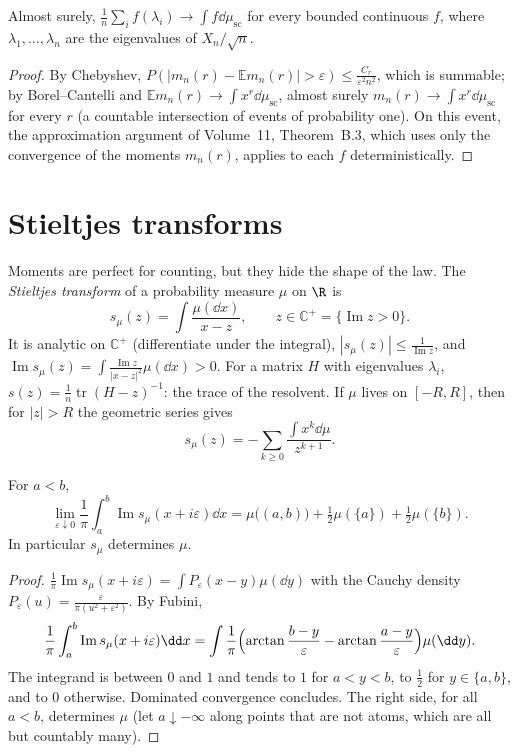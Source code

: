 \begin{theorem}\label{thm:wigneras}
Almost surely, $\frac1n\sum_if(\lambda_i)\to\int f\dd\mu_{\mathrm{sc}}$ for every bounded continuous $f$, where $\lambda_1,\dots,\lambda_n$ are the eigenvalues of $X_n/\sqrt n$.
\end{theorem}

\begin{proof}
By Chebyshev, $P(|m_n(r)-\mathbb Em_n(r)|>\varepsilon)\le\frac{C_r}{\varepsilon^2n^2}$, which is summable; by Borel--Cantelli and $\mathbb Em_n(r)\to\int x^r\dd\mu_{\mathrm{sc}}$, almost surely $m_n(r)\to\int x^r\dd\mu_{\mathrm{sc}}$ for every $r$ (a
countable intersection of events of probability one). On this event, the approximation argument of Volume~11, Theorem~B.3, which uses only the convergence of the moments $m_n(r)$, applies to each $f$ deterministically.
\end{proof}

\section{Stieltjes transforms}

Moments are perfect for counting, but they hide the shape of the law. The \emph{Stieltjes transform} of a probability measure $\mu$ on $\R$ is
\[
s_\mu(z)=\int\frac{\mu(\dd x)}{x-z},\qquad z\in\mathbb C^+=\{\operatorname{Im}z>0\}.
\]
It is analytic on $\mathbb C^+$ (differentiate under the integral), $|s_\mu(z)|\le\frac1{\operatorname{Im}z}$, and $\operatorname{Im}s_\mu(z)=\int\frac{\operatorname{Im}z}{|x-z|^2}\mu(\dd x)>0$. For a matrix $H$ with eigenvalues $\lambda_i$,
$s(z)=\frac1n\operatorname{tr}(H-z)^{-1}$: the trace of the resolvent. If $\mu$ lives on $[-R,R]$, then for $|z|>R$ the geometric series gives
\begin{equation}\label{eq:stieltjesmoments}
s_\mu(z)=-\sum_{k\ge0}\frac{\int x^k\dd\mu}{z^{k+1}}.
\end{equation}

\begin{proposition}\label{prop:inversion}
For $a<b$,
\[
\lim_{\varepsilon\downarrow0}\frac1\pi\int_a^b\operatorname{Im}s_\mu(x+i\varepsilon)\dd x=\mu\bigl((a,b)\bigr)+\tfrac12\mu(\{a\})+\tfrac12\mu(\{b\}).
\]
In particular $s_\mu$ determines $\mu$.
\end{proposition}

\begin{proof}
$\frac1\pi\operatorname{Im}s_\mu(x+i\varepsilon)=\int P_\varepsilon(x-y)\mu(\dd y)$ with the Cauchy density $P_\varepsilon(u)=\frac{\varepsilon}{\pi(u^2+\varepsilon^2)}$. By Fubini,
\[
\frac1\pi\int_a^b\operatorname{Im}s_\mu(x+i\varepsilon)\dd x=\int\frac1\pi\Bigl(\arctan\frac{b-y}\varepsilon-\arctan\frac{a-y}\varepsilon\Bigr)\mu(\dd y).
\]
The integrand is between $0$ and $1$ and tends to $1$ for $a<y<b$, to $\frac12$ for $y\in\{a,b\}$, and to $0$ otherwise. Dominated convergence concludes. The right side, for all $a<b$, determines $\mu$ (let $a\downarrow-\infty$
along points that are not atoms, which are all but countably many).
\end{proof}

